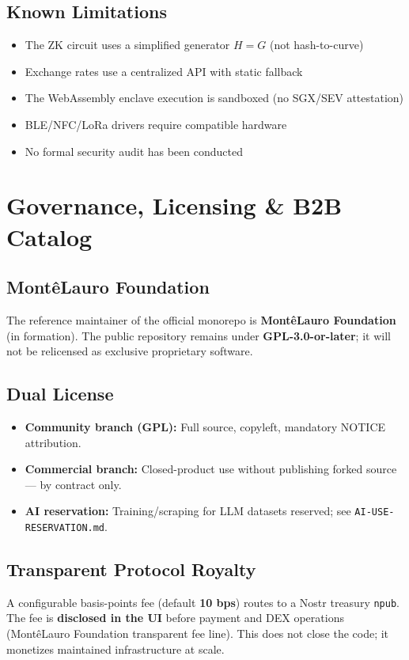\documentclass[11pt,a4paper]{article}
\begin{document}
\subsection{Known Limitations}
\begin{itemize}[nosep]
  \item The ZK circuit uses a simplified generator $H = G$ (not hash-to-curve)
  \item Exchange rates use a centralized API with static fallback
  \item The WebAssembly enclave execution is sandboxed (no SGX/SEV attestation)
  \item BLE/NFC/LoRa drivers require compatible hardware
  \item No formal security audit has been conducted
\end{itemize}

\section{Governance, Licensing \& B2B Catalog}

\subsection{MontêLauro Foundation}
The reference maintainer of the official monorepo is \textbf{MontêLauro Foundation} (in formation). The public repository remains under \textbf{GPL-3.0-or-later}; it will not be relicensed as exclusive proprietary software.

\subsection{Dual License}
\begin{itemize}[nosep]
  \item \textbf{Community branch (GPL):} Full source, copyleft, mandatory NOTICE attribution.
  \item \textbf{Commercial branch:} Closed-product use without publishing forked source --- by contract only.
  \item \textbf{AI reservation:} Training/scraping for LLM datasets reserved; see \texttt{AI-USE-RESERVATION.md}.
\end{itemize}

\subsection{Transparent Protocol Royalty}
A configurable basis-points fee (default \textbf{10 bps}) routes to a Nostr treasury \texttt{npub}. The fee is \textbf{disclosed in the UI} before payment and DEX operations (MontêLauro Foundation transparent fee line). This does not close the code; it monetizes maintained infrastructure at scale.
\end{document}
